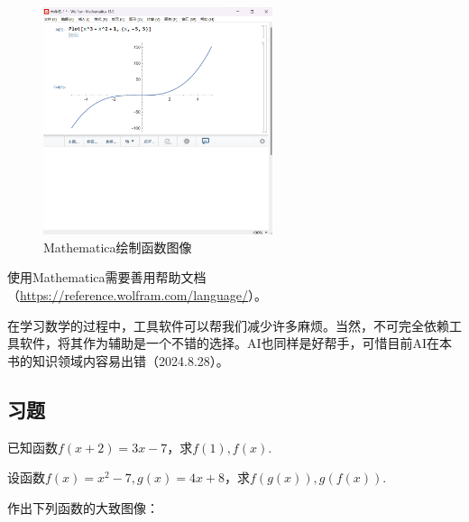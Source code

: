 \documentclass[lang=cn,math=cm,chinesefont=nofont,11pt,scheme=chinese,twocol]{elegantbook}
\begin{document}
\begin{figure}[h]
  \centering
  \includegraphics[width=0.6\textwidth]{image/mathematica2.png}
  \caption{Mathematica绘制函数图像}
  \label{img:mathematica2}
\end{figure}

使用Mathematica需要善用帮助文档（\href{https://reference.wolfram.com/language/}{https://reference.wolfram.com/language/}）。

在学习数学的过程中，工具软件可以帮我们减少许多麻烦。当然，不可完全依赖工具软件，将其作为辅助是一个不错的选择。AI也同样是好帮手，可惜目前AI在本书的知识领域内容易出错（2024.8.28）。

\subsection{习题}

\begin{exercise}\label{2017RJB.P94.8.changed}
  已知函数$f(x+2)=3x-7$，求$f(1),f(x)$.
\end{exercise}

\begin{exercise}
  设函数$f(x)=x^2-7,g(x)=4x+8$，求$f(g(x)),g(f(x))$.
\end{exercise}

\begin{exercise}
  作出下列函数的大致图像：
\end{exercise}
\end{document}
